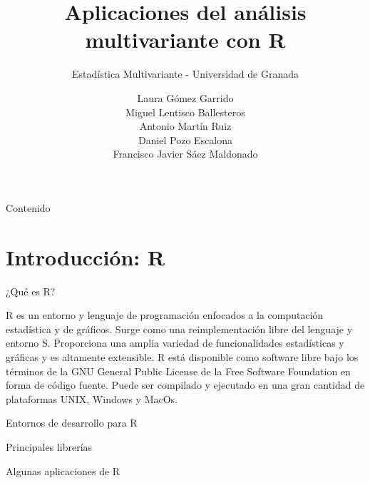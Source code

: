 \documentclass[xcolor=table]{beamer}
\title{Aplicaciones del análisis multivariante con R}
\subtitle{Estadística Multivariante - Universidad de Granada}
\author{Laura Gómez Garrido\\ Miguel Lentisco Ballesteros \\ Antonio Martín Ruiz \\ Daniel Pozo Escalona \\Francisco Javier Sáez Maldonado}
\begin{document}
\begin{frame}
\titlepage
\end{frame}
\begin{frame}{Contenido}
  \tableofcontents
\end{frame}
\section{Introducción: R}

\begin{frame}{¿Qué es R?}

R es un entorno y lenguaje de programación enfocados a la computación estadística y de gráficos. Surge como una reimplementación libre del lenguaje y entorno S. Proporciona una amplia variedad de funcionalidades estadísticas y gráficas y es altamente extensible.
\newline
\newline
R está disponible como software libre bajo los términos de la GNU General Public License de la Free Software Foundation en forma de código fuente. Puede ser compilado y ejecutado en una gran cantidad de plataformas UNIX, Windows y MacOs.

\end{frame}

\begin{frame}{Entornos de desarrollo para R}
\end{frame}

\begin{frame}{Principales librerías}

\end{frame}

\begin{frame}{Algunas aplicaciones de R}
\end{frame}
\end{document}
